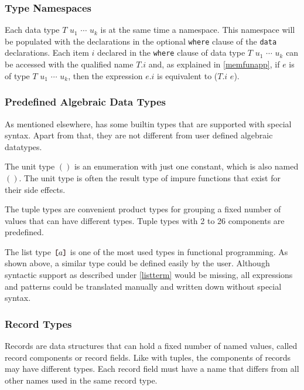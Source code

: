 \subsubsection{Type Namespaces}

Each data type $T$ $u_1$ $\cdots$ $u_k$ is at the same time a namespace. 
This namespace will be populated with the declarations in the optional \texttt{where} clause of the \texttt{data} declarations.
Each item $i$ declared in the \texttt{where} clause of data type $T$ $u_1$ $\cdots$ $u_k$  can be accessed with the qualified name $T$.$i$ and, 
as explained in \autoref{memfunapp}, 
if $e$ is of type $T$ $u_1$ $\cdots$ $u_k$, 
then the expression $e$.$i$ is equivalent to ($T$.$i$ $e$).

\subsubsection{Predefined Algebraic Data Types} \label{predef}

As mentioned elsewhere, \frege{} has some builtin types that are supported with special syntax. Apart from that, they are not different from user defined algebraic datatypes.

\label{unittype}
The unit type $()$ is an enumeration with just one constant, which is also named $()$. The unit type is often the result type of impure functions that exist for their side effects.

\label{tupletypes} 
The tuple types are convenient product types for grouping a fixed number of  values that can have different types. Tuple types with 2 to 26 components are predefined.

\label{listtype} 
The list type $\bracka{}a\brackz{}$ is one of the most used types in functional programming. As shown above, a similar type could be defined easily by the user. Although syntactic support as described under \autoref{listterm} would be missing, all expressions and patterns could be translated manually and written down without special syntax.

\subsubsection{Record Types} \label{recordtypes}   
Records are data structures that can hold a fixed number of named values, called record components or record fields.
Like with tuples, the components of records may have different types.
Each record field must have a name that differs from all
other names used in the same record type.

